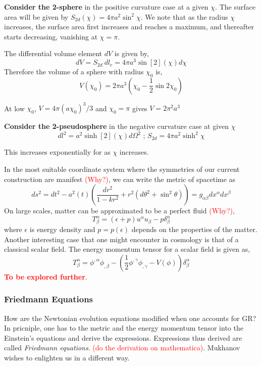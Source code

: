 \documentclass[a4paper,11pt]{article}
\begin{document}
\textbf{Consider the 2-sphere} in the positive curvature case at a given $\chi$. The surface area will be given by $S_{2d}(\chi) = 4 \pi a^2 \sin^2 \chi$. We note that as the radius $\chi$ increases, the surface area first increases and reaches a maximum, and thereafter starts decreasing, vanishing at $\chi=\pi$.

The differential volume element $dV$ is given by,
$$dV = S_{2d} \ dl_r = 4 \pi a^3 \sin[2](\chi) d \chi$$ Therefore the volume of a sphere with radius $\chi_0$ is,
$$V(\chi_0) = 2 \pi a^3 (\chi_0 - \frac{1}{2} \sin 2\chi_0)$$

At low $\chi_0$, $V = 4 \pi (a \chi_0)^3/3$ and $\chi_0=\pi$ gives $V = 2 \pi^2 a^3$

\textbf{Consider the 2-pseudosphere} in the negative curvature case at 	given $\chi$
$$dl^2 = a^2 \sinh[2](\chi)d \Omega^2 \text{ ; } S_{2d} =4 \pi a^2 \sinh^2 \chi $$

This increases exponentially for as $\chi$ increases.

In the most suitable coordinate system where the symmetries of our current construction are manifest \textcolor{red}{(Why?)}, we can write the metric of spacetime as 
$$ds^2 = dt^2 - a^2(t) \left(\frac{dr^2}{1 - k{r^2}} + r^2(d\theta^2 + \sin^2\theta)\right) = g_{\alpha \beta} dx^\alpha dx^\beta$$ On large scales, matter can be approximated to be a perfect fluid \textcolor{red}{(Why?)},
$$T^\alpha_\beta = (\epsilon+p)u^\alpha u_\beta - p \delta^\alpha_\beta$$
where $\epsilon$ is energy density and $p= p (\epsilon)$ depends on the properties of the matter. Another interesting case that one might encounter in cosmology is that of a classical scalar field. The energy momentum tensor for a scalar field is given as,
$$T^\alpha_\beta = \phi^{,\alpha} \phi_{,\beta} - \left( \frac{1}{2}\phi^{,\gamma} \phi_{,\gamma} - V(\phi) \right)\delta^\alpha_\beta$$
\textbf{\textcolor{red}{To be explored further}}.

\subsubsection{Friedmann Equations}

How are the Newtonian evolution equations modified when one accounts for GR? In pricniple, one has to the metric and the energy momentum tensor into the Einstein's equations and derive the expressions. Expressions thus derived are called \textit{Friedmann equations}. \textcolor{red}{(do the derivation on mathematica)}. Mukhanov wishes to enlighten us in a different way.
\end{document}
